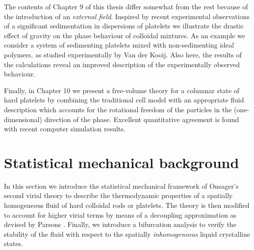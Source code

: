 {The contents of  Chapter 9 of this thesis differ somewhat from the  rest because of the introduction of an  {\em external field}.
Inspired by recent experimental observations of a significant sedimentation in dispersions of platelets
 we illustrate the drastic effect of gravity
 on the phase behaviour of colloidal mixtures. As an example we consider a system
of sedimenting platelets mixed with non-sedimenting ideal polymers, as studied
experimentally by Van der Kooij. Also here,  the results of the calculations
reveal an improved description of the experimentally observed
behaviour.

Finally, in Chapter  10  we present a free-volume theory for a columnar state of hard platelets  by combining the traditional cell model with an appropriate fluid description which accounts for the rotational freedom of the particles in the (one-dimensional) direction of the phase. Excellent quantitative agreement is found with recent computer simulation results.



\section{Statistical mechanical background}
\noindent In this section we introduce the statistical mechanical framework
of  Onsager's second virial theory \cite{onsager1949,Vroege92,Cotter} to
describe the thermodynamic properties of a spatially homogeneous fluid of
hard colloidal rods or
platelets. The theory is then modified to account for
higher virial terms by means of a decoupling approximation as devised by Parsons \cite{Parsons}.
Finally, we introduce a bifurcation analysis to verify  the stability of the  fluid
with respect to the spatially {\em inhomogeneous} liquid crystalline states.

}
